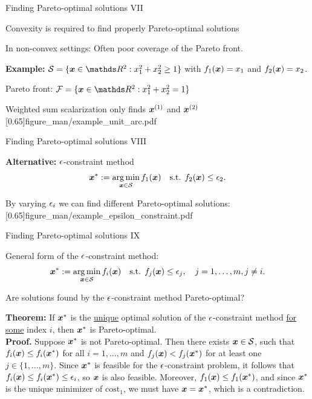 \documentclass[11pt,compress,t,notes=noshow,xcolor=table]{beamer}
\begin{document}
\begin{framei}[align=top]{Finding Pareto-optimal solutions VII}
\item Convexity is required to find properly Pareto-optimal solutions
\item In non-convex settings: Often poor coverage of the Pareto front.
\item \textbf{Example:} $\S = \{\xv \in \R^2: x_1^2+x_2^2 \geq 1\}$ with $f_1(\bm{x}) = x_1$ and $f_2(\bm{x})=x_2$.
\item {\color{orange}Pareto front:} $\mathcal{F} = \{\xv \in \R^2: x_1^2+x_2^2=1\}$
\item {\color{blue}Weighted sum scalarization} only finds {\color{blue}$\bm{x}^{(1)}$} and {\color{blue}$\bm{x}^{(2)}$}
\imageFixed{4cm}{4.3cm}[0.65]{figure_man/example_unit_arc.pdf}
\end{framei}


\begin{framei}[align=top]{Finding Pareto-optimal solutions VIII}
\item \textbf{Alternative:} $\epsilon$-constraint method
$$\bm{x}^\ast := \mathop{\mathrm{arg\,min}}_{\bm{x} \in \mathcal{S}} f_1(\bm{x}) \quad \text{s.t. } f_{2}(\bm{x}) \leq \epsilon_2.$$
\item By varying $\epsilon_i$ we can find different Pareto-optimal solutions:
\imageFixed{4cm}{4.3cm}[0.65]{figure_man/example_epsilon_constraint.pdf}
\end{framei}


\begin{framei}{Finding Pareto-optimal solutions IX}
\item General form of the $\epsilon$-constraint method:
$$\bm{x}^\ast := \mathop{\mathrm{arg\,min}}_{\bm{x} \in \mathcal{S}} f_i(\bm{x}) \quad \text{s.t. } f_j(\bm{x}) \leq \epsilon_j, \quad j=1,\dots,m, j \neq i.$$
\item Are solutions found by the $\epsilon$-constraint method Pareto-optimal?
\item \textbf{Theorem:} If $\bm{x}^\ast$ is the \underline{unique} optimal solution of the $\epsilon$-constraint method \underline{for some} index $i$, then $\bm{x}^\ast$ is Pareto-optimal.\\
\spacer
\textbf{Proof.} Suppose $\bm{x}^\ast$ is not Pareto-optimal. Then there exists $\bm{x} \in \mathcal{S}$, such that $f_i(\bm{x}) \leq f_i(\bm{x}^\ast)$ for all $i = 1, \dots, m$ and $f_j(\bm{x}) < f_j(\bm{x}^\ast)$ for at least one $j \in \{1, \dots, m\}$.
Since $\bm{x}^\ast$ is feasible for the $\epsilon$-constraint problem, it follows that $f_i(\bm{x}) \leq f_i(\bm{x}^\ast) \leq \epsilon_i$, so $\bm{x}$ is also feasible.
Moreover, $f_1(\bm{x}) \leq f_1(\bm{x}^\ast)$, and since $\bm{x}^\ast$ is the unique minimizer of $\text{cost}_1$, we must have $\bm{x} = \bm{x}^\ast$, which is a contradiction.
\end{framei}
\end{document}
